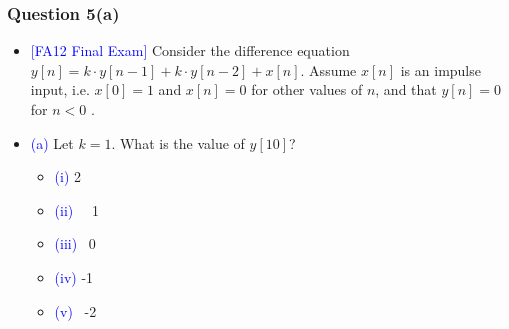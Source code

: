 \documentclass{beamer}
\newcommand{\blue}[1]{\textcolor{blue}{#1}}
\begin{document}
\begin{frame}
\frametitle{Question 5(a)}

\begin{itemize} \itemsep1pt \parskip0pt 
  \item[] \blue{[FA12 Final Exam]} Consider the difference equation $y[n] = k \cdot y[n-1] + k \cdot y[n-2] + x[n]$. \newline Assume $x[n]$ is an impulse input, i.e. $x[0] = 1$ and $x[n] = 0$ for other values of $n$, and that $y[n] = 0$ for $n < 0$ .
\end{itemize}

\vspace{8 mm}

\begin{itemize} \itemsep1pt \parskip0pt 
  \item[] \blue{(a)} Let $k = 1$. What is the value of $y[10]$?
  \begin{itemize} \itemsep1pt \parskip0pt 
    \item[] \blue{(i)} \hspace{3 mm}2
    \item[] \blue{(ii)} ~~1
    \item[] \blue{(iii)} ~0
    \item[] \blue{(iv)} \hspace{0.5 mm}-1
    \item[] \blue{(v)} ~-2
  \end{itemize}
\end{itemize}
\vspace{6 cm}

\end{frame}

\end{document}
